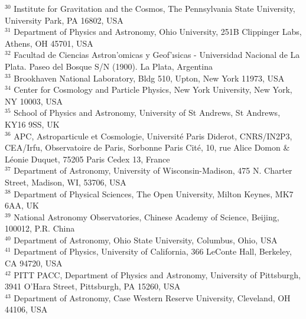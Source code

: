 {\scriptsize $^{30}$ Institute for Gravitation and the Cosmos, The Pennsylvania State University, University Park, PA 16802, USA\vspace*{-2pt} \\ 
\scriptsize $^{31}$ Department of Physics and Astronomy, Ohio University, 251B Clippinger Labs, Athens, OH 45701, USA\vspace*{-2pt} \\ 
\scriptsize $^{32}$ Facultad de Ciencias Astron'omicas y Geof{'\i}sicas - Universidad Nacional de La Plata. Paseo del Bosque S/N (1900). La Plata, Argentina\vspace*{-2pt} \\ 
\scriptsize $^{33}$ Brookhaven National Laboratory, Bldg 510, Upton, New York 11973, USA\vspace*{-2pt} \\ 
\scriptsize $^{34}$ Center for Cosmology and Particle Physics, New York University, New York, NY 10003, USA\vspace*{-2pt} \\ 
\scriptsize $^{35}$ School of Physics and Astronomy, University of St Andrews, St Andrews, KY16 9SS, UK\vspace*{-2pt} \\ 
\scriptsize $^{36}$ APC, Astroparticule et Cosmologie, Universit\'e Paris Diderot, CNRS/IN2P3, CEA/Irfu, Observatoire de Paris, Sorbonne Paris Cit\'e, 10, rue Alice Domon \& L\'eonie Duquet, 75205 Paris Cedex 13, France\vspace*{-2pt} \\ 
\scriptsize $^{37}$ Department of Astronomy, University of Wisconsin-Madison, 475 N. Charter Street, Madison, WI, 53706, USA\vspace*{-2pt} \\ 
\scriptsize $^{38}$ Department of Physical Sciences, The Open University, Milton Keynes, MK7 6AA, UK\vspace*{-2pt} \\ 
\scriptsize $^{39}$ National Astronomy Observatories, Chinese Academy of Science, Beijing, 100012, P.R. China\vspace*{-2pt} \\ 
\scriptsize $^{40}$ Department of Astronomy, Ohio State University, Columbus, Ohio, USA\vspace*{-2pt} \\ 
\scriptsize $^{41}$ Department of Physics, University of California, 366 LeConte Hall, Berkeley, CA 94720, USA\vspace*{-2pt} \\ 
\scriptsize $^{42}$ PITT PACC, Department of Physics and Astronomy, University of Pittsburgh, 3941 O'Hara Street, Pittsburgh, PA 15260, USA\vspace*{-2pt} \\ 
\scriptsize $^{43}$ Department of Astronomy, Case Western Reserve University, Cleveland, OH 44106, USA\vspace*{-2pt} \\ 
}